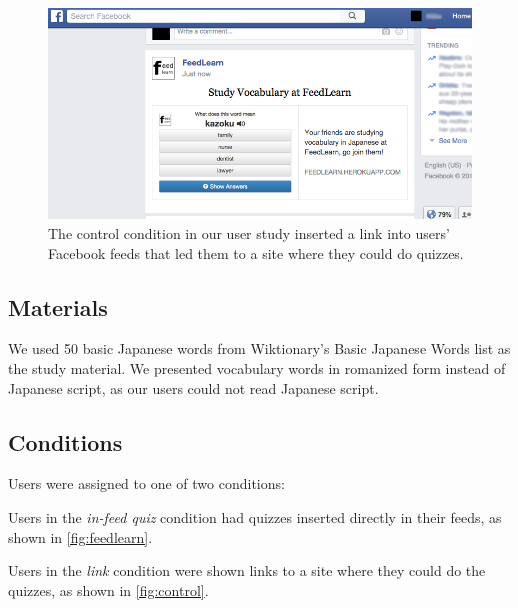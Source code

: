 \documentclass{sigchi}
\begin{document}

\begin{figure}
\centering
\includegraphics[width=1.0\columnwidth]{feedlearn-link-screenshot}
\caption{The control condition in our user study inserted a link into users' Facebook feeds that led them to a site where they could do quizzes.}
\label{fig:control}
\end{figure}

\subsection{Materials}

We used 50 basic Japanese words from Wiktionary's Basic Japanese Words list as the study material. We presented vocabulary words in romanized form instead of Japanese script, as our users could not read Japanese script.


\subsection{Conditions}

Users were assigned to one of two conditions:

\begin{compactitem}
\item Users in the \textit{in-feed quiz} condition had quizzes inserted directly in their feeds, as shown in \autoref{fig:feedlearn}.
\item Users in the \textit{link} condition were shown links to a site where they could do the quizzes, as shown in \autoref{fig:control}.
\end{compactitem}
\end{document}
